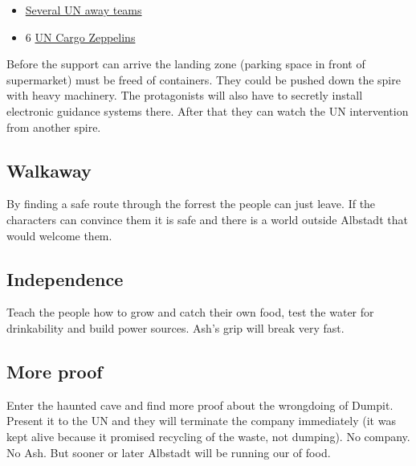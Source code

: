 \begin{itemize}
    \item \hyperref[sec: UN away team]{Several UN away teams}
    \item 6 \hyperref[sec: UN Cargo Zeppelins]{UN Cargo Zeppelins}
\end{itemize}

Before the support can arrive the landing zone (parking space in front of supermarket) must be freed of containers. They could be pushed down the spire with heavy machinery. The protagonists will also have to secretly install electronic guidance systems there. After that they can watch the UN intervention from another spire.

\subsection{Walkaway}

By finding a safe route through the forrest the people can just leave. If the characters can convince them it is safe and there is a world outside Albstadt that would welcome them.

\subsection{Independence}

Teach the people how to grow and catch their own food, test the water for drinkability and build power sources. Ash's grip will break very fast.

\subsection{More proof}

Enter the haunted cave and find more proof about the wrongdoing of Dumpit. Present it to the UN and they will terminate the company immediately (it was kept alive because it promised recycling of the waste, not dumping). No company. No Ash. But sooner or later Albstadt will be running our of food.
